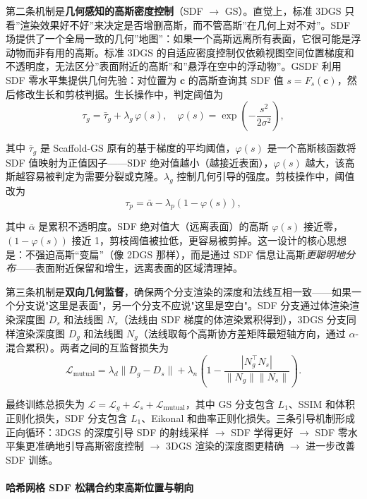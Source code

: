 第二条机制是\textbf{几何感知的高斯密度控制}（SDF $\to$ GS）。直觉上，标准 3DGS 只看”渲染效果好不好”来决定是否增删高斯，而不管高斯”在几何上对不对”。SDF 场提供了一个全局一致的几何”地图”：如果一个高斯远离所有表面，它很可能是浮动物而非有用的高斯。标准 3DGS 的自适应密度控制仅依赖视图空间位置梯度和不透明度，无法区分”表面附近的高斯”和”悬浮在空中的浮动物”。GSDF 利用 SDF 零水平集提供几何先验：对位置为 $\mathbf{c}$ 的高斯查询其 SDF 值 $s = F_s(\mathbf{c})$，然后修改生长和剪枝判据。生长操作中，判定阈值为
\begin{equation}
    \tau_g = \bar{\tau}_g + \lambda_g \, \varphi(s), \quad \varphi(s) = \exp\!\left(-\frac{s^2}{2\sigma^2}\right),
\end{equation}

其中 $\bar{\tau}_g$ 是 Scaffold-GS 原有的基于梯度的平均阈值，$\varphi(s)$ 是一个高斯核函数将 SDF 值映射为正值因子——SDF 绝对值越小（越接近表面），$\varphi(s)$ 越大，该高斯越容易被判定为需要分裂或克隆。$\lambda_g$ 控制几何引导的强度。剪枝操作中，阈值改为
\begin{equation}
    \tau_p = \bar{\alpha} - \lambda_p(1 - \varphi(s)),
\end{equation}

其中 $\bar{\alpha}$ 是累积不透明度。SDF 绝对值大（远离表面）的高斯 $\varphi(s)$ 接近零，$(1-\varphi(s))$ 接近 1，剪枝阈值被拉低，更容易被剪掉。这一设计的核心思想是：不强迫高斯“变扁”（像 2DGS 那样），而是通过 SDF 信息让高斯\emph{更聪明地分布}——表面附近保留和增生，远离表面的区域清理掉。

第三条机制是\textbf{双向几何监督}，确保两个分支渲染的深度和法线互相一致——如果一个分支说"这里是表面"，另一个分支不应说"这里是空白"。SDF 分支通过体渲染渲染深度图 $D_s$ 和法线图 $N_s$（法线由 SDF 梯度的体渲染累积得到），3DGS 分支同样渲染深度图 $D_g$ 和法线图 $N_g$（法线取每个高斯协方差矩阵最短轴方向，通过 $\alpha$-混合累积）。两者之间的互监督损失为
\begin{equation}
    \mathcal{L}_{\text{mutual}} = \lambda_d \|D_g - D_s\| + \lambda_n\left(1 - \frac{|N_g^\top N_s|}{\|N_g\|\|N_s\|}\right).
\end{equation}

最终训练总损失为 $\mathcal{L} = \mathcal{L}_g + \mathcal{L}_s + \mathcal{L}_{\text{mutual}}$，其中 GS 分支包含 $L_1$、SSIM 和体积正则化损失，SDF 分支包含 $L_1$、Eikonal 和曲率正则化损失。三条引导机制形成正向循环：3DGS 的深度引导 SDF 的射线采样 $\to$ SDF 学得更好 $\to$ SDF 零水平集更准确地引导高斯密度控制 $\to$ 3DGS 渲染的深度图更精确 $\to$ 进一步改善 SDF 训练。

\paragraph{哈希网格 SDF 松耦合约束高斯位置与朝向}

